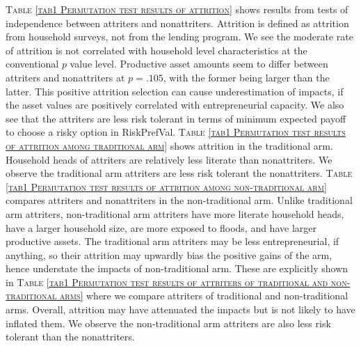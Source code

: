 	\textsc{\normalsize Table \ref{tab1 Permutation test results of attrition}} shows results from tests of independence between attriters and nonattriters. Attrition is defined as attrition from household surveys, not from the lending program. We see the moderate rate of attrition is not correlated with household level characteristics%
	at the conventional $p$ value level. Productive asset amounts seem to differ between attriters and nonattriters at $p=.105$, with the former being larger than the latter. This positive attrition selection can cause underestimation of impacts, if the asset values are positively correlated with entrepreneurial capacity. We also see that the attriters are less risk tolerant in terms of minimum expected payoff to choose a risky option in \textsf{RiskPrefVal}. \textsc{\normalsize Table \ref{tab1 Permutation test results of attrition among traditional arm}} shows attrition in the \textsf{traditional} arm. Household heads of attriters are relatively less literate than nonattriters. We observe the \textsf{traditional} arm attriters are less risk tolerant the nonattriters.
	\textsc{\normalsize Table \ref{tab1 Permutation test results of attrition among non-traditional arm}} compares attriters and nonattriters in the non-\textsf{traditional} arm. Unlike \textsf{traditional} arm attriters, non-\textsf{traditional} arm attriters have more literate household heads, have a larger household size, are more exposed to floods, and have larger productive assets. The \textsf{traditional} arm attriters may be less entrepreneurial, if anything, so their attrition may upwardly bias the positive gains of the arm, hence understate the impacts of non-\textsf{traditional} arm. These are explicitly shown in \textsc{\normalsize Table \ref{tab1 Permutation test results of attriters of traditional and non-traditional arms}} where we compare attriters of \textsf{traditional} and non-\textsf{traditional} arms. Overall, attrition may have attenuated the impacts but is not likely to have inflated them. We observe the non-\textsf{traditional} arm attriters are also less risk tolerant than the nonattriters.

